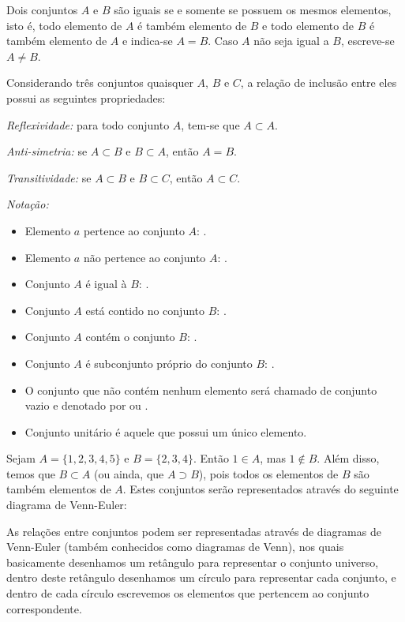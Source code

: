  \begin{obs}
 Dois conjuntos $A$ e $B$ são iguais se e somente se possuem os mesmos elementos, isto é, todo elemento de $A$ é também elemento de $B$ e todo elemento de $B$ é também elemento 
 de $A$ e indica-se $A=B$. Caso $A$ não seja igual a $B$, escreve-se $A\neq B$.
 \end{obs}


Considerando três conjuntos quaisquer $A$, $B$ e $C$, a relação de inclusão entre eles possui as seguintes propriedades:

\textit{Reflexividade:} para todo conjunto $A$, tem-se que $A \subset A$.

\textit{Anti-simetria:} se $A \subset B$ e $B \subset A$, então $A= B$.

\textit{Transitividade:} se $A \subset B$ e $B \subset C$, então $A \subset C$.

\begin{obs} \emph{Notação:}
\begin{itemize}
 \item Elemento $a$ pertence ao conjunto $A$: .
 \item Elemento $a$ não pertence ao conjunto $A$: .
  \item Conjunto $A$ é igual à $B$: .
 \item Conjunto $A$ está contido no conjunto $B$: .
 \item Conjunto $A$ contém o conjunto $B$: .
 \item Conjunto $A$ é subconjunto próprio do conjunto $B$: .
 \item O conjunto que não contém nenhum elemento será chamado de conjunto vazio e denotado por \destaque{\varnothing} ou \destaque{\{ \}}.
 \item Conjunto unitário é aquele que possui um único elemento.
\end{itemize}
\end{obs}
 
 \begin{exem}
  Sejam $A= \{1, 2, 3, 4, 5 \}$ e $B=\{ 2, 3, 4\}$. Então $1 \in A$, mas $1 \notin B$. Além disso, temos que $B \subset A$ (ou ainda, que $A \supset B$), pois todos os elementos de $B$ são também elementos de $A$. Estes conjuntos serão representados através do seguinte diagrama de Venn-Euler:
 \end{exem}

 As relações entre conjuntos podem ser representadas através de diagramas de Venn-Euler (também conhecidos como diagramas de Venn), nos quais basicamente desenhamos um retângulo para representar o conjunto universo, dentro deste retângulo desenhamos um círculo para representar cada conjunto, e dentro de cada círculo escrevemos os elementos que pertencem ao conjunto correspondente.

